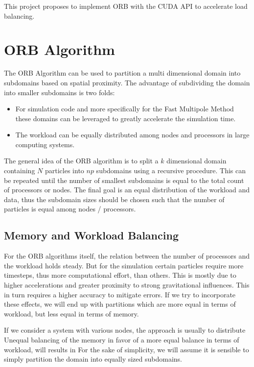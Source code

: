 \documentclass[]{article}
\begin{document}
This project proposes to implement ORB with the CUDA API to accelerate load balancing.

\section{ORB Algorithm}


The ORB Algorithm can be used to partition a multi dimensional domain into subdomains based on spatial proximity. The advantage of subdividing the domain into smaller subdomains is two folds:

\begin{itemize}
	\item For simulation code and more specifically for the Fast Multipole Method these domains can be leveraged to greatly accelerate the simulation time. 
	\item The workload can be equally distributed among nodes and processors in large computing systems.
\end{itemize} 


The general idea of the ORB algorithm is to split a $k$ dimensional domain containing $N$ particles into $np$ subdomains using a recursive procedure. This can be repeated until the number of smallest subdomains is equal to the total count of processors or nodes. The final goal is an equal distribution of the workload and data, thus the subdomain sizes should be chosen such that the number of particles is equal among nodes / processors.

\subsection{Memory and Workload Balancing}
For the ORB algorithms itself, the relation between the number of processors and the workload holds steady. But for the simulation certain particles require more timesteps, thus more computational effort, than others. This is mostly due to higher accelerations and greater proximity to strong gravitational influences. This in turn requires a higher accuracy to mitigate errors. If we try to incorporate these effects, we will end up with partitions which are more equal in terms of workload, but less equal in terms of memory. 

\vspace{5mm}
If we consider a system with various nodes, the approach is usually to distribute 
Unequal balancing of the memory in favor of a more equal balance in terms of workload, will results in 
 For the sake of simplicity, we will assume it is sensible to simply partition the domain into equally sized subdomains.
\end{document}
